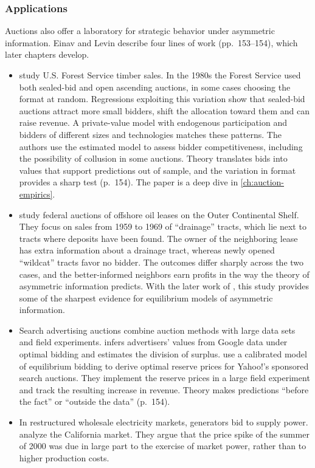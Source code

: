 \subsubsection{Applications}

Auctions also offer a laboratory for strategic behavior under asymmetric information. Einav and Levin
describe four lines of work (pp.~153--154), which later chapters develop.
\begin{itemize}
  \item \citet{AtheyLevinSeira2011} study U.S. Forest Service timber sales. In the 1980s the Forest Service
        used both sealed-bid and open ascending auctions, in some cases choosing the format at random.
        Regressions exploiting this variation show that sealed-bid auctions attract more small bidders,
        shift the allocation toward them and can raise revenue. A private-value model with endogenous
        participation and bidders of different sizes and technologies matches these patterns. The authors use
        the estimated model to assess bidder competitiveness, including the possibility of collusion in some
        auctions. Theory translates bids into values that support predictions out of sample, and the
        variation in format provides a sharp test (p.~154). The paper is a deep dive in
        \cref{ch:auction-empirics}.
  \item \citet{HendricksPorter1988} study federal auctions of offshore oil leases on the Outer Continental
        Shelf. They focus on sales from 1959 to 1969 of ``drainage'' tracts, which lie next to tracts where
        deposits have been found. The owner of the neighboring lease has extra information about a
        drainage tract, whereas newly opened ``wildcat'' tracts favor no bidder. The
        outcomes differ sharply across the two cases, and the better-informed neighbors earn profits in the
        way the theory of asymmetric information predicts. With the later work of
        \citet{HendricksPinksePorter2003}, this study provides some of the sharpest evidence for equilibrium
        models of asymmetric information.
  \item Search advertising auctions combine auction methods with large data sets and field experiments.
        \citet{Varian2009} infers advertisers' values from Google data under optimal bidding and estimates the
        division of surplus. \citet{OstrovskySchwarz2009} use a calibrated model of equilibrium bidding to
        derive optimal reserve prices for Yahoo!'s sponsored search auctions. They implement the reserve
        prices in a large field experiment and track the resulting increase in revenue. Theory makes
        predictions ``before the fact'' or ``outside the data'' (p.~154).
  \item In restructured wholesale electricity markets, generators bid to supply power.
        \citet{BorensteinBushnellWolak2002} analyze the California market. They argue that the price spike
        of the summer of 2000 was due in large part to the exercise of market power, rather than to higher
        production costs.
\end{itemize}

